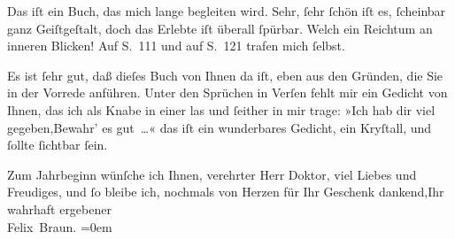 \pstart
           Das iſt ein Buch, das mich
               lange begleiten wird. Sehr, ſehr ſchön iſt es, ſcheinbar ganz Geiſtgeſtalt, doch das
               Erlebte iſt überall ſpürbar. {\pb}Welch ein
               Reichtum an inneren Blicken! Auf S. 111 \label{K_L02494-1v}\label{K_L02494-1} und auf
               S. 121 \label{K_L02494-2v}\label{K_L02494-2} trafen mich ſelbst.\pend
           
\pstart
           Es ist ſehr gut, daß dieſes Buch von Ihnen da iſt, eben aus den Gründen, die Sie in
               der Vorrede anführen. Unter den Sprüchen in Verſen fehlt mir ein Gedicht von Ihnen,
               das ich als Knabe in einer \label{K_L02494-3v}\label{K_L02494-3} las und ſeither in mir trage:\pend
           \stanza{}»Ich hab dir viel gegeben,Bewahr’ es gut {\dots}«\stanzaend{}
\pstart
           das iſt ein wunderbares Gedicht, ein Kryſtall, und ſollte ſichtbar ſein.\pend
           
\pstart
           Zum Jahrbeginn wünſche ich Ihnen, verehrter Herr Doktor, viel Liebes und
               Freudiges, und ſo bleibe {\pb}ich, nochmals
               von Herzen für Ihr Geschenk dankend,\hspace*{1.5em}Ihr wahrhaft ergebener{\\[\baselineskip]}\spacefill\mbox{Felix Braun.}\pend
           \leftskip=0em{}\endnumbering{}  
      